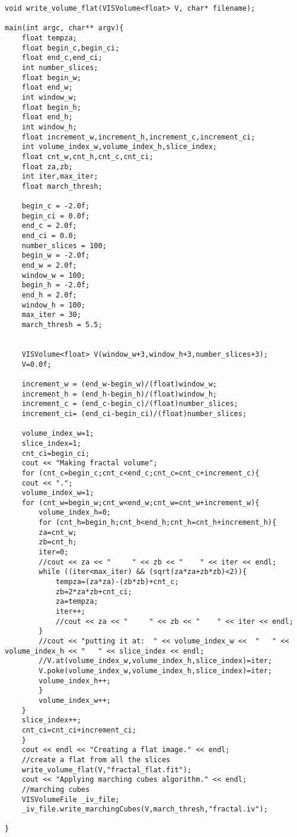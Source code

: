 \begin{appendix}
\begin{verbatim}
void write_volume_flat(VISVolume<float> V, char* filename);

main(int argc, char** argv){
    float tempza;
    float begin_c,begin_ci;
    float end_c,end_ci;
    int number_slices;
    float begin_w;
    float end_w;
    int window_w;
    float begin_h;
    float end_h;
    int window_h;
    float increment_w,increment_h,increment_c,increment_ci;
    int volume_index_w,volume_index_h,slice_index;
    float cnt_w,cnt_h,cnt_c,cnt_ci;
    float za,zb;
    int iter,max_iter;
    float march_thresh;

    begin_c = -2.0f;
    begin_ci = 0.0f;
    end_c = 2.0f;
    end_ci = 0.0;
    number_slices = 100;
    begin_w = -2.0f;
    end_w = 2.0f;
    window_w = 100;
    begin_h = -2.0f;
    end_h = 2.0f;
    window_h = 100;
    max_iter = 30;
    march_thresh = 5.5;

    
    VISVolume<float> V(window_w+3,window_h+3,number_slices+3);
    V=0.0f;

    increment_w = (end_w-begin_w)/(float)window_w;
    increment_h = (end_h-begin_h)/(float)window_h;
    increment_c = (end_c-begin_c)/(float)number_slices;
    increment_ci= (end_ci-begin_ci)/(float)number_slices;

    volume_index_w=1;
    slice_index=1;
    cnt_ci=begin_ci;
    cout << "Making fractal volume";
    for (cnt_c=begin_c;cnt_c<end_c;cnt_c=cnt_c+increment_c){
	cout << ".";
	volume_index_w=1;
	for (cnt_w=begin_w;cnt_w<end_w;cnt_w=cnt_w+increment_w){
	    volume_index_h=0;
	    for (cnt_h=begin_h;cnt_h<end_h;cnt_h=cnt_h+increment_h){
		za=cnt_w;
		zb=cnt_h;
		iter=0;
		//cout << za << "     " << zb << "    " << iter << endl;
		while ((iter<max_iter) && (sqrt(za*za+zb*zb)<2)){
		    tempza=(za*za)-(zb*zb)+cnt_c;
		    zb=2*za*zb+cnt_ci;
		    za=tempza;
		    iter++;
		    //cout << za << "     " << zb << "    " << iter << endl;
		}
		//cout << "putting it at:  " << volume_index_w <<  "   " << volume_index_h << "   " << slice_index << endl;
		//V.at(volume_index_w,volume_index_h,slice_index)=iter;
		V.poke(volume_index_w,volume_index_h,slice_index)=iter;
		volume_index_h++;
	    }
	    volume_index_w++;
	}
	slice_index++;
	cnt_ci=cnt_ci+increment_ci;
    }
    cout << endl << "Creating a flat image." << endl;
    //create a flat from all the slices
    write_volume_flat(V,"fractal_flat.fit");
    cout << "Applying marching cubes algorithm." << endl;
    //marching cubes
    VISVolumeFile _iv_file;
    _iv_file.write_marchingCubes(V,march_thresh,"fractal.iv");

}


\end{verbatim}
\end{appendix}

